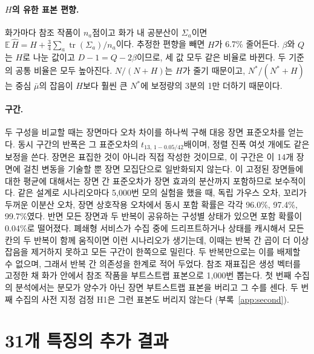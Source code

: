 \paragraph{$H$의 유한 표본 편향.} 화가마다 참조 작품이 $n_a$점이고 화가 내 공분산이 $\Sigma_a$이면
$\mathbb E\,\widehat H=H+\frac34\sum_a\operatorname{tr}(\Sigma_a)/n_a$이다. 추정한 편향을 빼면 $H$가
6.7\% 줄어든다. $\beta$와 $Q$는 $H$로 나눈 값이고 $D-1=Q-2\beta$이므로, 세 값 모두 같은 비율로 바뀐다.
두 기준의 공통 비율은 모두 높아진다. $N/(N+H)$는 $H$가 줄기 때문이고, $N^*/(N^*+H)$는 중심 $\bar\mu$의
잡음이 $H$보다 훨씬 큰 $N^*$에 보정량의 3분의 1만 더하기 때문이다.

\paragraph{구간.} 두 구성을 비교할 때는 장면마다 오차 차이를 하나씩 구해 대응 장면 표준오차를 얻는다.
동시 구간의 반폭은 그 표준오차의 $t_{13,\,1-0.05/42}$배이며, 정렬 진폭 여섯 개에도 같은 보정을 쓴다.
장면은 표집한 것이 아니라 직접 작성한 것이므로, 이 구간은 이 14개 장면에 걸친 변동을 기술할 뿐 장면
모집단으로 일반화되지 않는다. 이 고정된 장면들에 대한 평균에 대해서는 장면 간 표준오차가 장면 효과의
분산까지 포함하므로 보수적이다. 같은 설계로 시나리오마다 5,000번 모의 실험을 했을 때, 독립 가우스 오차,
꼬리가 두꺼운 이분산 오차, 장면 상호작용 오차에서 동시 포함 확률은 각각 96.0\%, 97.4\%, 99.7\%였다.
반면 모든 장면과 두 반복이 공유하는 구성별 상태가 있으면 포함 확률이 0.04\%로 떨어졌다. 폐쇄형 서비스가
수집 중에 드리프트하거나 상태를 캐시해서 모든 칸의 두 반복이 함께 움직이면 이런 시나리오가 생기는데,
이때는 반복 간 곱이 더 이상 잡음을 제거하지 못하고 모든 구간이 한쪽으로 밀린다. 두 반복만으로는 이를
배제할 수 없으며, 그래서 반복 간 의존성을 한계로 적어 두었다. 참조 재표집은 생성 벡터를 고정한 채 화가
안에서 참조 작품을 부트스트랩 표본으로 1,000번 뽑는다. 첫 번째 수집의 분석에서는 분모가 양수가 아닌 장면
부트스트랩 표본을 버리고 그 수를 센다. 두 번째 수집의 사전 지정 검정 H1은 그런 표본도 버리지 않는다
(부록~\ref{app:second}).

\FloatBarrier
\section{31개 특징의 추가 결과}\label{app:hand}













